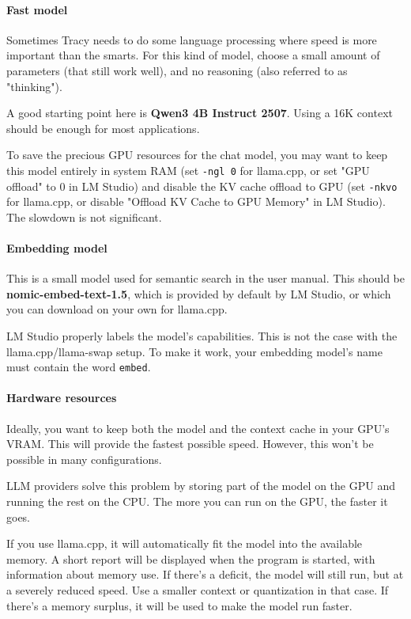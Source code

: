 \documentclass[hidelinks,titlepage,a4paper,twoside]{article}
\begin{document}
\paragraph{Fast model}

Sometimes Tracy needs to do some language processing where speed is more important than the smarts. For this kind of model, choose a small amount of parameters (that still work well), and no reasoning (also referred to as "thinking").

A good starting point here is \textbf{Qwen3 4B Instruct 2507}. Using a 16K context should be enough for most applications.

To save the precious GPU resources for the chat model, you may want to keep this model entirely in system RAM (set \texttt{-ngl 0} for llama.cpp, or set "GPU offload" to 0 in LM Studio) and disable the KV cache offload to GPU (set \texttt{-nkvo} for llama.cpp, or disable "Offload KV Cache to GPU Memory" in LM Studio). The slowdown is not significant.

\paragraph{Embedding model}

This is a small model used for semantic search in the user manual. This should be \textbf{nomic-embed-text-1.5}, which is provided by default by LM Studio, or which you can download on your own for llama.cpp.

LM Studio properly labels the model's capabilities. This is not the case with the llama.cpp/llama-swap setup. To make it work, your embedding model's name must contain the word \texttt{embed}.

\paragraph{Hardware resources}

Ideally, you want to keep both the model and the context cache in your GPU's VRAM. This will provide the fastest possible speed. However, this won't be possible in many configurations.

LLM providers solve this problem by storing part of the model on the GPU and running the rest on the CPU. The more you can run on the GPU, the faster it goes.

If you use llama.cpp, it will automatically fit the model into the available memory. A short report will be displayed when the program is started, with information about memory use. If there's a deficit, the model will still run, but at a severely reduced speed. Use a smaller context or quantization in that case. If there's a memory surplus, it will be used to make the model run faster.
\end{document}
